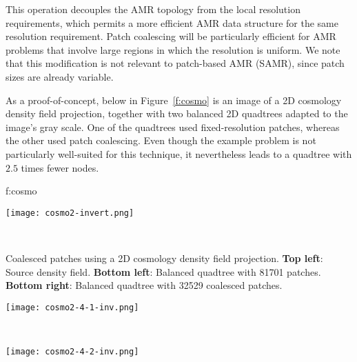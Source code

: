 \documentclass[10pt,twocolumn]{article}
\begin{document}



This operation decouples the AMR topology from the local resolution
requirements, which permits a more efficient AMR data structure for
the same resolution requirement.  Patch coalescing will be
particularly efficient for AMR problems that involve large regions in
which the resolution is uniform.  We note that this modification is
not relevant to patch-based AMR (SAMR), since patch sizes are already
variable.

As a proof-of-concept, below in Figure~\ref{f:cosmo} is an image of a
2D cosmology density field projection, together with two balanced 2D
quadtrees adapted to the image's gray scale.  One of the quadtrees
used fixed-resolution patches, whereas the other used patch
coalescing.  Even though the example problem is not particularly
well-suited for this technique, it nevertheless leads to a quadtree
with $2.5$ times fewer nodes.

 {f:cosmo}{
\begin{minipage}{3.2in}
\begin{minipage}{1.5in}
\texttt{[image: cosmo2-invert.png]}
\end{minipage} \
\begin{minipage}{1.5in} \raggedright
\small Coalesced patches using a 2D cosmology
  density field projection.  \textbf{Top left}: Source density field.
  \textbf{Bottom left}: Balanced quadtree with 81701 patches.
  \textbf{Bottom right}: Balanced quadtree with 32529 coalesced patches.
\end{minipage}
\begin{minipage}{1.5in}
\texttt{[image: cosmo2-4-1-inv.png]}
\end{minipage} \ 
\begin{minipage}{1.5in}
\texttt{[image: cosmo2-4-2-inv.png]}
\end{minipage}
\end{minipage}
}
\end{document}
